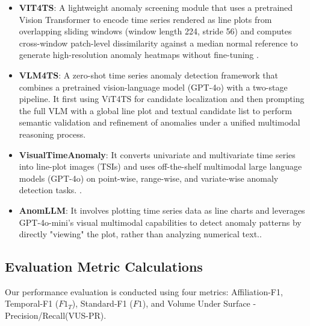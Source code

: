 \documentclass{article}
\theoremstyle{plain}
\theoremstyle{definition}
\theoremstyle{remark}
\begin{document}
\begin{itemize}
    \item \textbf{VIT4TS}: A lightweight anomaly screening module that uses a pretrained Vision Transformer to encode time series rendered as line plots from overlapping sliding windows (window length 224, stride 56) and computes cross-window patch-level dissimilarity against a median normal reference to generate high-resolution anomaly heatmaps without fine-tuning\citep{he2025harnessing} .
    \item \textbf{VLM4TS}: A zero-shot time series anomaly detection framework that combines a pretrained vision-language model (GPT-4o) with a two-stage pipeline. It first using ViT4TS for candidate localization and then prompting the full VLM with a global line plot and textual candidate list to perform semantic validation and refinement of anomalies under a unified multimodal reasoning process\citep{he2025harnessing}.
    \item \textbf{VisualTimeAnomaly}: It converts univariate and multivariate time series into line-plot images (TSIs) and uses off-the-shelf multimodal large language models (GPT-4o) on point-wise, range-wise, and variate-wise anomaly detection tasks. \citep{xu2025can}.
    \item \textbf{AnomLLM}: It involves plotting time series data as line charts and leverages GPT-4o-mini's visual multimodal capabilities to detect anomaly patterns by directly "viewing" the plot, rather than analyzing numerical text.\cite{zhou2024llmsunderstandtimeseries}.
\end{itemize}

\subsection{Evaluation Metric Calculations}\label{appendix:metric}

Our performance evaluation is conducted using four metrics: Affiliation-F1, Temporal-F1 ($F1_T$), Standard-F1 ($F1$), and Volume Under Surface - Precision/Recall(VUS-PR). 
\end{document}
